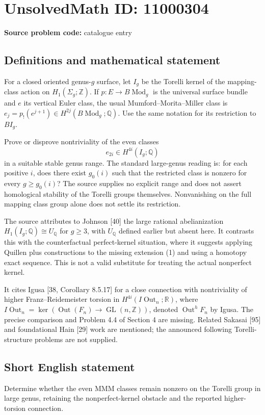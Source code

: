 \documentclass[11pt]{article}
\newcommand{\Z}{\mathbb{Z}}
\newcommand{\Q}{\mathbb{Q}}
\newcommand{\R}{\mathbb{R}}
\begin{document}
\section*{UnsolvedMath ID: 11000304}
\textbf{Source problem code:} catalogue entry
\subsection{Definitions and mathematical statement}
For a closed oriented genus-\(g\) surface, let \(I_g\) be the Torelli kernel of the mapping-class action on \(H_1(\Sigma_g;\Z)\). If \(p:E\to B\operatorname{Mod}_g\) is the universal surface bundle and \(e\) its vertical Euler class, the usual Mumford--Morita--Miller class is \(e_j=p_!(e^{j+1})\in H^{2j}(B\operatorname{Mod}_g;\Q)\). Use the same notation for its restriction to \(BI_g\).

Prove or disprove nontriviality of the even classes
\[
 e_{2i}\in H^{4i}(I_g;\Q)
\]
in a suitable stable genus range. The standard large-genus reading is: for each positive \(i\), does there exist \(g_0(i)\) such that the restricted class is nonzero for every \(g\geq g_0(i)\)? The source supplies no explicit range and does not assert homological stability of the Torelli groups themselves. Nonvanishing on the full mapping class group alone does not settle its restriction.

The source attributes to Johnson [40] the large rational abelianization \(H_1(I_g;\Q)\cong U_\Q\) for \(g\geq3\), with \(U_\Q\) defined earlier but absent here. It contrasts this with the counterfactual perfect-kernel situation, where it suggests applying Quillen plus constructions to the missing extension (1) and using a homotopy exact sequence. This is not a valid substitute for treating the actual nonperfect kernel.

It cites Igusa [38, Corollary 8.5.17] for a close connection with nontriviality of higher Franz--Reidemeister torsion in
\(H^{4i}(I\operatorname{Out}_n;\R)\), where
\(I\operatorname{Out}_n=\ker(\operatorname{Out}(F_n)\to\operatorname{GL}(n,\Z))\), denoted \(\operatorname{Out}^{h}F_n\) by Igusa. The precise comparison and Problem 4.4 of Section 4 are missing. Related Sakasai [95] and foundational Hain [29] work are mentioned; the announced following Torelli-structure problems are not supplied.
\subsection{Short English statement}
Determine whether the even MMM classes remain nonzero on the Torelli group in large genus, retaining the nonperfect-kernel obstacle and the reported higher-torsion connection.
\end{document}

